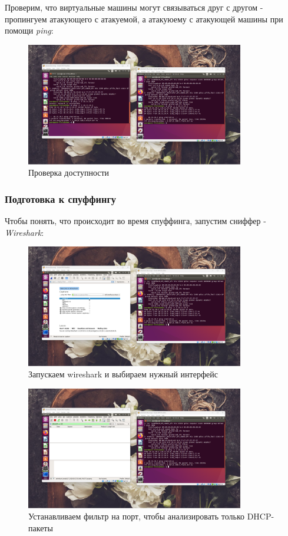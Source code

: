 \documentclass[a4paper]{article}
\begin{document}
  Проверим, что виртуальные машины могут связываться друг с другом - пропингуем атакующего с атакуемой,
  а атакуюему с атакующей машины при помощи \textit{ping}:

  \begin{figure}[H]
    \centering
    \includegraphics[width=0.85\textwidth]{02_00 (16)}
    \caption{Проверка доступности}
    \label{img:0013}
  \end{figure}

  \subsubsection{Подготовка к спуффингу}

  Чтобы понять, что происходит во время спуффинга, запустим сниффер - \textit{Wireshark}:

  \begin{figure}[H]
    \centering
    \includegraphics[width=0.85\textwidth]{02_00 (17)}
    \caption{Запускаем wireshark и выбираем нужный интерфейс}
    \label{img:0014}
  \end{figure}

  \begin{figure}[H]
    \centering
    \includegraphics[width=0.85\textwidth]{02_00 (18)}
    \caption{Устанавливаем фильтр на порт, чтобы анализировать только DHCP-пакеты}
    \label{img:0015}
  \end{figure}
\end{document}
